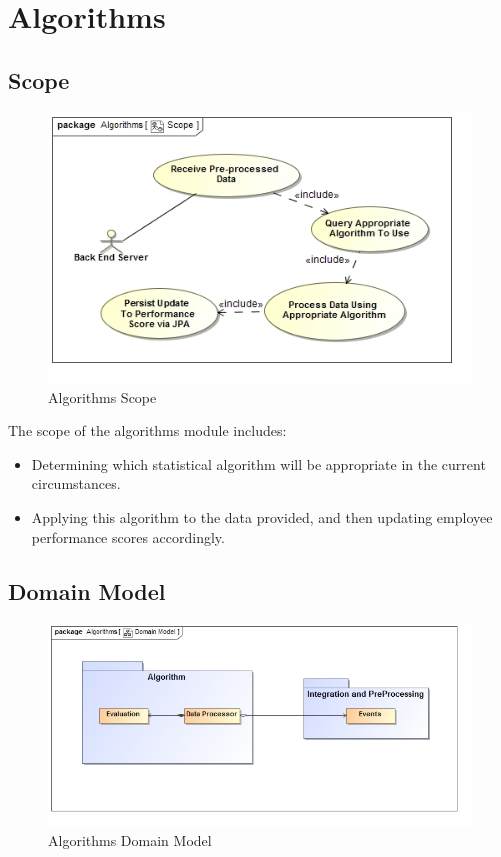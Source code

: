 \documentclass[11pt,a4paper]{article}
\begin{document}
\pagebreak

\section{Algorithms}
\subsection{Scope}
\begin{figure}[H]
	\begin{center}
		\includegraphics[scale=0.75]{../Images/Algorithms_Scope.jpg}
		\caption{Algorithms Scope}
	\end{center}
\end{figure}
The scope of the algorithms module includes:
\begin{itemize}
	\item Determining which statistical algorithm will be appropriate in the current circumstances.
	\item Applying this algorithm to the data provided, and then updating employee performance scores accordingly.
\end{itemize}

\subsection{Domain Model}
\begin{figure}[H]
	\begin{center}
		\includegraphics[scale=0.6]{../Images/Algorithm_Domain.jpg}
		\caption{Algorithms Domain Model}
	\end{center}
\end{figure}
\end{document}
